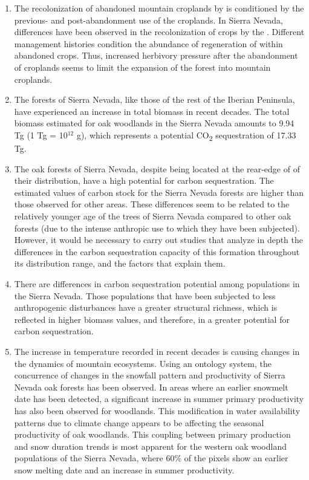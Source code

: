 \begin{enumerate}
    \item The recolonization of abandoned mountain croplands by \Qp is conditioned by the  previous- and post-abandonment use of the croplands. In Sierra Nevada, differences have been observed in the recolonization of crops by the \Qp. Different management histories condition the abundance of regeneration of \Qp within abandoned crops. Thus, increased herbivory pressure after the abandonment of croplands seems to limit the expansion of the forest into mountain croplands.
    
    \item The \Qp forests of Sierra Nevada, like those of the rest of the Iberian Peninsula, have experienced an increase in total biomass in recent decades. The total biomass estimated for oak woodlands in the Sierra Nevada amounts to 9.94 Tg (1 Tg = 10$^{12}$ g), which represents a potential CO\textsubscript{2} sequestration of 17.33 Tg.
    
    \item The oak forests of Sierra Nevada, despite being located at the rear-edge of of their distribution, have a high potential for carbon sequestration. The estimated values of carbon stock for the Sierra Nevada \Qp forests are higher than those observed for other areas. These differences seem to be related to the relatively younger age of the \Qp trees of Sierra Nevada compared to other oak forests (due to the intense anthropic use to which they have been subjected). However, it would be necessary to carry out studies that analyze in depth the differences in the carbon sequestration capacity of this formation throughout its distribution range, and the factors that explain them. 
    
    \item There are differences in carbon sequestration potential among \Qp populations in the Sierra Nevada. Those populations that have been subjected to less anthropogenic disturbances have a greater structural richness, which is reflected in higher biomass values, and therefore, in a greater potential for carbon sequestration.
    
    \item The increase in temperature recorded in recent decades is causing changes in the dynamics of mountain ecosystems. Using an ontology system, the concurrence of changes in the snowfall pattern and productivity of Sierra Nevada oak forests has been observed. In areas where an earlier snowmelt date has been detected, a significant increase in summer primary productivity has also been observed for \Qp woodlands. This modification in water availability patterns due to climate change appears to be affecting the seasonal productivity of oak woodlands. This coupling between primary production and snow duration trends is most apparent for the western oak woodland populations of the Sierra Nevada, where 60\% of the pixels show an earlier snow melting date and an increase in summer productivity. 
    

\end{enumerate}
